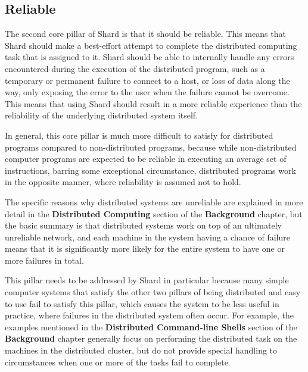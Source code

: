 \documentclass[oneside]{report}
\begin{document}
\subsection{Reliable}

The second core pillar of Shard is that it should be reliable.
This means that Shard should make a best-effort attempt to complete the distributed computing task that is assigned to it.
Shard should be able to internally handle any errors encountered during the execution of the distributed program, such as a temporary or permanent failure to connect to a host, or loss of data along the way, only exposing the error to the user when the failure cannot be overcome.
This means that using Shard should result in a more reliable experience than the reliability of the underlying distributed system itself.

In general, this core pillar is much more difficult to satisfy for distributed programs compared to non-distributed programs, because while non-distributed computer programs are expected to be reliable in executing an average set of instructions, barring some exceptional circumstance, distributed programs work in the opposite manner, where reliability is assumed not to hold.

The specific reasons why distributed systems are unreliable are explained in more detail in the \textbf{Distributed Computing} section of the \textbf{Background} chapter, but the basic summary is that distributed systems work on top of an ultimately unreliable network, and each machine in the system having a chance of failure means that it is significantly more likely for the entire system to have one or more failures in total.

This pillar needs to be addressed by Shard in particular because many simple computer systems that satisfy the other two pillars of being distributed and easy to use fail to satisfy this pillar, which causes the system to be less useful in practice, where failures in the distributed system often occur.
For example, the examples mentioned in the \textbf{Distributed Command-line Shells} section of the \textbf{Background} chapter generally focus on performing the distributed task on the machines in the distributed cluster, but do not provide special handling to circumstances when one or more of the tasks fail to complete.
\end{document}
